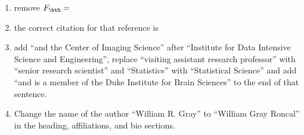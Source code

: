 \documentclass[12pt]{article}
\begin{document}
\begin{enumerate}
	\item remove $F_{\bth}=$
	\item the correct citation for that reference is \cite{vogelstein2011shuffled}
	\item add ``and the Center of Imaging Science'' after ``Institute for Data Intensive Science and Engineering'',  replace ``visiting assistant research professor'' with ``senior research scientist'' and ``Statistics'' with ``Statistical Science'' and add ``and is a member of the Duke Institute for Brain Sciences'' to the end of that sentence.
	\item Change the name of the author ``William R. Gray'' to ``William Gray Roncal'' in the heading, affiliations, and bio sections.
\end{enumerate}




\end{document}
